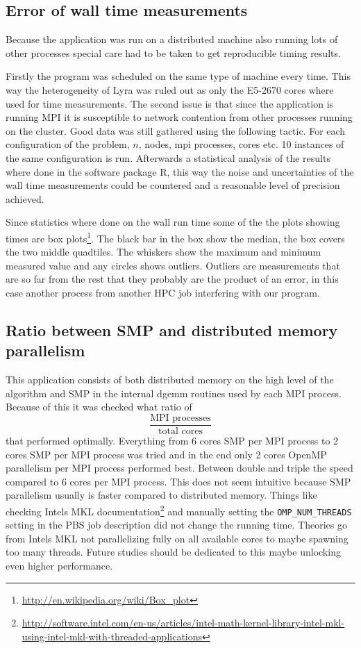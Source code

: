 \documentclass{article}
\begin{document}
\subsection{Error of wall time measurements}
Because the application was run on a distributed machine also running lots of
other processes special care had to be taken to get reproducible timing results.

Firstly the program was scheduled on the same type of machine every time. This
way the heterogeneity of Lyra was ruled out as only the E5-2670 cores where used
for time measurements. The second issue is that since the application is running
MPI it is susceptible to network contention from other processes running on the
cluster. Good data was still gathered using the following tactic. For each configuration
of the problem, $n$, nodes, mpi processes, cores etc. 10 instances of the same
configuration is run. Afterwards a statistical analysis of the results where done
in the software package R\cite{r-project}, this way the noise and uncertainties of the
wall time measurements could be countered and a reasonable level of precision achieved.

Since statistics where done on the wall run time some of the the plots showing times 
are box plots\footnote{\url{http://en.wikipedia.org/wiki/Box_plot}}. The black bar
in the box show the median, the box covers the two middle quadtiles. The whiskers show the maximum
and minimum measured value and any circles shows outliers. Outliers are measurements
that are so far from the rest that they probably are the product of an error,
in this case another process from another HPC job interfering with our program.

\subsection{Ratio between SMP and distributed memory parallelism}
This application consists of both distributed memory on the high
level of the algorithm and SMP in the internal dgemm routines used
by each MPI process. Because of this it was checked what ratio of
\[
\frac{\text{MPI processes}}{\text{total cores}}
\]
that performed optimally. Everything from 6 cores SMP per MPI process to
2 cores SMP per MPI process was tried and in the end only 2 cores OpenMP
parallelism per MPI process performed best. Between double and triple the
speed compared to 6 cores per MPI process. This does not seem intuitive
because SMP parallelism usually is faster compared to distributed  memory.
Things like checking Intels MKL documentation\footnote{\url{http://software.intel.com/en-us/articles/intel-math-kernel-library-intel-mkl-using-intel-mkl-with-threaded-applications}} and manually setting the
\verb+OMP_NUM_THREADS+ setting in the PBS job description did not change the running time.
Theories go from Intels MKL not parallelizing fully on all available cores to maybe spawning too many threads.
Future studies should be dedicated to this maybe unlocking even higher performance.
\end{document}

